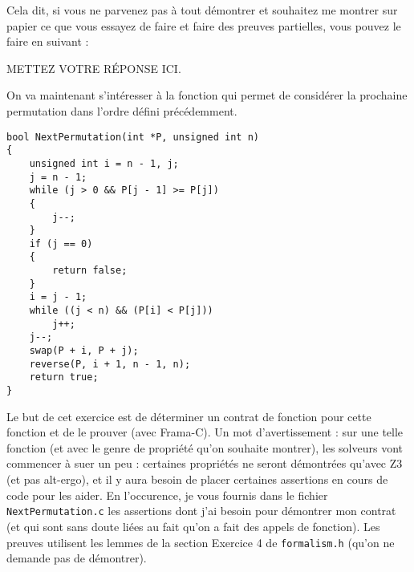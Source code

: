 \documentclass[11pt,answers]{exam}
\begin{document}
\begin{questions}
\begin{parts}
    Cela dit, si vous ne parvenez pas à tout démontrer et souhaitez me montrer sur papier ce que vous essayez de faire et faire des preuves partielles, vous pouvez le faire en suivant :

    \begin{solutionorbox}
        METTEZ VOTRE RÉPONSE ICI.
    \end{solutionorbox}

    \end{parts}



    On va maintenant s’intéresser à la fonction qui permet de considérer la prochaine permutation dans l’ordre défini précédemment.

    \begin{lstlisting}
bool NextPermutation(int *P, unsigned int n)
{
    unsigned int i = n - 1, j;
    j = n - 1;
    while (j > 0 && P[j - 1] >= P[j])
    {
        j--;
    }
    if (j == 0)
    {
        return false;
    }
    i = j - 1;
    while ((j < n) && (P[i] < P[j]))
        j++;
    j--;
    swap(P + i, P + j);
    reverse(P, i + 1, n - 1, n);
    return true;
}
    \end{lstlisting}

    Le but de cet exercice est de déterminer un contrat de fonction pour cette fonction et de le prouver (avec Frama-C).
    Un mot d’avertissement : sur une telle fonction (et avec le genre de propriété qu’on souhaite montrer), les solveurs vont commencer à suer un peu : certaines propriétés ne seront démontrées qu’avec Z3 (et pas alt-ergo), et il y aura besoin de placer certaines assertions en cours de code pour les aider. En l’occurence, je vous fournis dans le fichier \texttt{NextPermutation.c} les assertions dont j’ai besoin pour démontrer mon contrat (et qui sont sans doute liées au fait qu’on a fait des appels de fonction).
    Les preuves utilisent les lemmes de la section Exercice 4 de \texttt{formalism.h} (qu’on ne demande pas de démontrer).

\end{questions}
\end{document}
